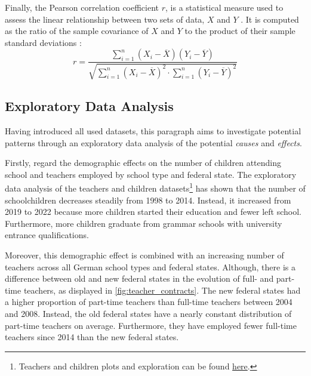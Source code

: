 Finally, the Pearson correlation coefficient $r$, is a statistical measure used to assess the linear relationship between two sets of data, $X$ and $Y$ \cite{rodgers_thirteen_1988}. It is computed as the ratio of the sample covariance of $X$ and $Y$ to the product of their sample standard deviations \cite{rodgers_thirteen_1988}:
\begin{equation}
    r = \frac{\sum_{i=1}^n (X_i - \overline{X}) (Y_i - \overline{Y})}{\sqrt{\sum_{i=1}^n(X_i-\overline{X})^2 \cdot \sum_{i=1}^n(Y_i-\overline{Y})^2}}
\end{equation}

\subsection{Exploratory Data Analysis}\label{sec:analysis}
Having introduced all used datasets, this paragraph aims to investigate potential patterns through an exploratory data analysis of the potential \emph{causes} and \emph{effects}. 

Firstly, regard the demographic effects on the number of children attending school and teachers employed by school type and federal state. The exploratory data analysis of the teachers and children datasets\footnote{\label{footnote:teachers-children}Teachers and children plots and exploration can be found \href{https://github.com/KarylReyne/DataLiteracyWS23/blob/main/exp/TF-005-TeachersToChildren.ipynb}{here}.} has shown that the number of schoolchildren decreases steadily from 1998 to 2014. Instead, it increased from 2019 to 2022 because more children started their education and fewer left school. Furthermore, more children graduate from grammar schools with university entrance qualifications.

Moreover, this demographic effect is combined with an increasing number of teachers across all German school types and federal states. %
Although, there is a difference between old and new federal states in the evolution of full- and part-time teachers, as displayed in \autoref{fig:teacher_contracts}. The new federal states had a higher proportion of part-time teachers than full-time teachers between 2004 and 2008. Instead, the old federal states have a nearly constant distribution of part-time teachers on average. Furthermore, they have employed fewer full-time teachers since 2014 than the new federal states. 


